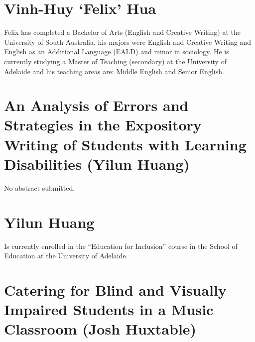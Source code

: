 \documentclass[twoside,12pt,a4paper,notitlepage]{memoir}
\begin{document}
\section*{Vinh-Huy `Felix’ Hua}

Felix has completed a Bachelor of Arts (English and Creative Writing) at the University of South Australia, his majors were English and Creative Writing and English as an Additional Language (EALD) and minor in sociology. He is currently studying a Master of Teaching (secondary) at the University of Adelaide and his teaching areas are: Middle English and Senior English.




\pagebreak
\section*{An Analysis of Errors and Strategies in the Expository Writing of Students with Learning Disabilities (Yilun Huang)}
\label{aut:huang}

No abstract submitted.

\section*{Yilun Huang}

Is currently enrolled in the ``Education for Inclusion'' course in the School of Education at the University of Adelaide.



\pagebreak
\section*{Catering for Blind and Visually Impaired Students in a Music Classroom (Josh Huxtable)}
\label{aut:huxtable}
\end{document}

